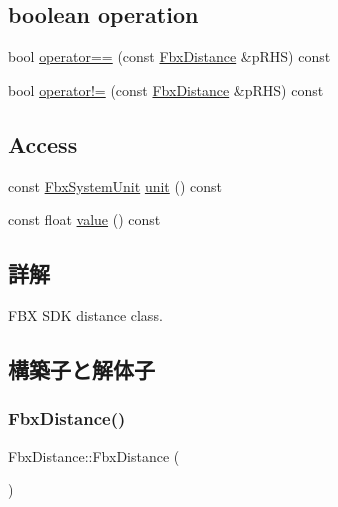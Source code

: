 \subsection*{boolean operation}
\begin{DoxyCompactItemize}
\item 
bool \hyperlink{class_fbx_distance_aaa4847c97c6545a8f439c234960e302a}{operator==} (const \hyperlink{class_fbx_distance}{Fbx\+Distance} \&p\+R\+HS) const
\item 
bool \hyperlink{class_fbx_distance_a71b53170c900475723294c6257ebd861}{operator!=} (const \hyperlink{class_fbx_distance}{Fbx\+Distance} \&p\+R\+HS) const
\end{DoxyCompactItemize}
\subsection*{Access}
\begin{DoxyCompactItemize}
\item 
const \hyperlink{class_fbx_system_unit}{Fbx\+System\+Unit} \hyperlink{class_fbx_distance_a205e0b8479de5b96079473facb81926c}{unit} () const
\item 
const float \hyperlink{class_fbx_distance_a00bb7d52cd3f2494429bf7126764d2c4}{value} () const
\end{DoxyCompactItemize}


\subsection{詳解}
F\+BX S\+DK distance class. 

\subsection{構築子と解体子}
\mbox{\label{class_fbx_distance_a2584c33efb6d9aac6118abb470592c67}} 
\subsubsection{\texorpdfstring{Fbx\+Distance()}{FbxDistance()}\hspace{0.1cm}{\footnotesize\ttfamily [1/3]}}
{\footnotesize\ttfamily Fbx\+Distance\+::\+Fbx\+Distance (\begin{DoxyParamCaption}{ }\end{DoxyParamCaption})}



